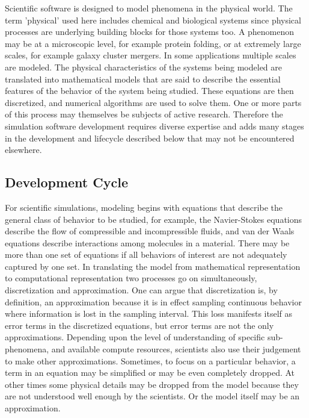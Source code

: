 \label{sec:lifecycle} 
Scientific software is designed to model phenomena in the
physical world. The term 'physical' used here includes chemical and
biological systems since physical processes are underlying building
blocks for those systems too. A phenomenon may be at a microscopic
level, for example protein folding, or at extremely large scales, for
example galaxy cluster mergers.  In some applications multiple scales
are modeled.  The physical characteristics of the systems being
modeled are translated into mathematical models that are said to
describe the essential features of the behavior of the system being 
studied. These equations are then discretized, and numerical algorithms
are used to solve them. One or more parts of this process may
themselves be subjects of active research. Therefore the simulation
software development requires diverse expertise and
adds many stages in the development and lifecycle described below that
may not be encountered elsewhere.  

\subsection{Development Cycle}
\label{sec:dev-cycle}
For scientific simulations, modeling begins with equations that describe the
general class of behavior to be studied, for example, the Navier-Stokes
equations describe the flow of compressible and incompressible
fluids, and van der Waals equations describe interactions among
molecules in a material. There may be more than one set of equations
if all behaviors of interest are not adequately captured by one set.
In translating the model from mathematical representation to
computational representation two processes go on simultaneously,
discretization and approximation. One can argue that discretization is,
by definition, an approximation because it is in effect sampling
continuous behavior where information is lost in the sampling
interval. This loss manifests itself as error terms in the discretized
equations, but error terms are not the only 
approximations. Depending upon the level of understanding of specific
sub-phenomena, and available compute resources, scientists also 
use their judgement to make other approximations. Sometimes, to focus on a
particular behavior, a term in an equation may be simplified or may be even completely
dropped. At other times some physical details may be dropped
from the model because they are not understood well enough by the
scientists.  Or the model itself may be an approximation.  

